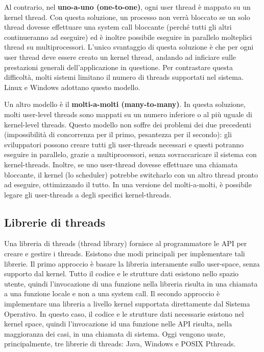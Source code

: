 \documentclass[a4paper]{article}
\begin{document}
Al contrario, nel \textbf{uno-a-uno (one-to-one)}, ogni user thread è mappato su un kernel thread. Con questa soluzione, un processo non verrà bloccato se un solo thread dovesse effettuare una system call bloccante (perché tutti gli altri continueranno ad eseguire) ed è inoltre possibile eseguire in parallelo molteplici thread su multiprocessori. L'unico svantaggio di questa soluzione è che per ogni user thread deve essere creato un kernel thread, andando ad inficiare sulle prestazioni generali dell'applicazione in questione. Per contrastare questa difficoltà, molti sistemi limitano il numero di threads supportati nel sistema. Linux e Windows adottano questo modello.

Un altro modello è il \textbf{molti-a-molti (many-to-many)}. In questa soluzione, molti user-level threads sono mappati su un numero inferiore o al più uguale di kernel-level threads. Questo modello non soffre dei problemi dei due precedenti (impossibilità di concorrenza per il primo, pesantezza per il secondo): gli sviluppatori possono creare tutti gli user-threads necessari e questi potranno eseguire in parallelo, grazie a multiprocessori, senza sovraccaricare il sistema con kernel-threads. Inoltre, se uno user-thread dovesse effettuare una chiamata bloccante, il kernel (lo scheduler) potrebbe switcharlo con un altro thread pronto ad eseguire, ottimizzando il tutto. In una versione del molti-a-molti, è possibile legare gli user-threads a degli specifici kernel-threads.

\subsection{Librerie di threads}
Una libreria di threads (thread library) fornisce al programmatore le API per creare e gestire i threads. Esistono due modi principali per implementare tali librerie. Il primo approccio è basare la libreria interamente sullo user-space, senza supporto dal kernel. Tutto il codice e le strutture dati esistono nello spazio utente, quindi l'invocazione di una funzione nella libreria risulta in una chiamata a una funzione locale e non a una system call. \newline
Il secondo approccio è implementare una libreria a livello kernel supportata direttamente dal Sistema Operativo. In questo caso, il codice e le strutture dati necessarie esistono nel kernel space, quindi l'invocazione id una funzione nelle API risulta, nella maggioranza dei casi, in una chiamata di sistema.\newline
Oggi vengono usate, principalmente, tre librerie di threads: Java, Windows e POSIX Pthreads.
\end{document}
